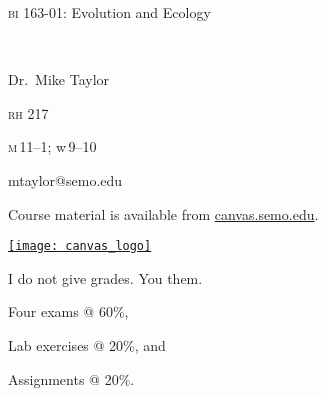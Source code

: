 \documentclass[t]{beamer}
\begin{document}
%
{
\begin{frame}[b]{\textcolor{orange7}{\textsc{bi} 163-01: Evolution and Ecology}}


\hfill\textcolor{white}{\tiny Fir0002, Wikimedia }
\end{frame}
}
%
{
\begin{frame}[t]
	\large
	\vspace{5ex}
	\hangpara\hspace{17em} Dr.~Mike Taylor

	\hangpara\hspace{17em} \textsc{rh} 217

	\hangpara\hspace{17em} \parbox{4cm}{\textsc{m}\,11--1; w\,9--10}

	\hangpara\hspace{17em} mtaylor@semo.edu
\end{frame}
}

\begin{frame}[t]{Course material is available from \href{https://canvas.semo.edu}{canvas.semo.edu}.}
		
\centering
		\href{https://semo.instructure.com}{\texttt{[image: canvas\_logo]}}
		
		\medskip
		
	
\end{frame}
%
\begin{frame}[t]{I do not give grades. You  them.}

	\hangpara Four exams @ 60\%,

	\hangpara Lab exercises @ 20\%, and

	\hangpara Assignments @ 20\%.

\end{frame}
%


{
\begin{frame}[b]
\end{frame}
}
\end{document}
